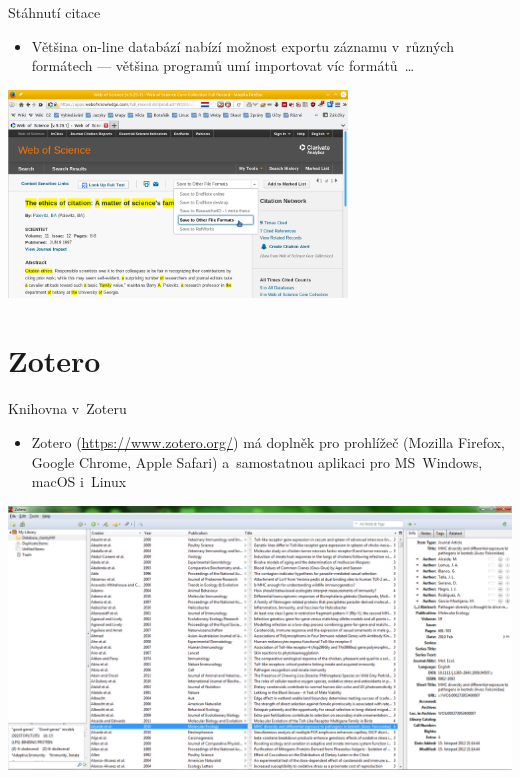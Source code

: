 \documentclass[compress, ucs, xelatex, xcolor=dvipsnames, print,
	hyperref={
		bookmarks=true,
		unicode=true,
		colorlinks=true,
		pdftitle={Citacni software},
		plainpages=false,
		pdfauthor={Vojtech Zeisek},
		pdfsubject={Kratky uvod do citacniho software},
		pdfcreator={XeLaTeX},
		pdfkeywords={citace, reference, software, literatura},
		linkcolor=Red,
		anchorcolor=Red,
		citecolor=Green,
		filecolor=Magenta,
		menucolor=Green,
		urlcolor=Cyan,
		pdftex},
	url={hyphens, lowtilde} %
	]{beamer}
\begin{document}
\begin{frame}{Stáhnutí citace}
	\begin{itemize}
		\item Většina on-line databází nabízí možnost exportu záznamu v~různých formátech --- většina programů umí importovat víc formátů~\ldots
	\end{itemize}
	\begin{center}
		\includegraphics[height=5.5cm]{export_z_wos.png}
	\end{center}
\end{frame}

\section{Zotero}

\begin{frame}{Knihovna v~Zoteru}
	\begin{itemize}
		\item Zotero (\url{https://www.zotero.org/}) má doplněk pro prohlížeč (Mozilla Firefox, Google Chrome, Apple Safari) a~samostatnou aplikaci pro MS~Windows, macOS i~Linux
	\end{itemize}
	\includegraphics[width=\textwidth]{zotero.png}
\end{frame}
\end{document}
